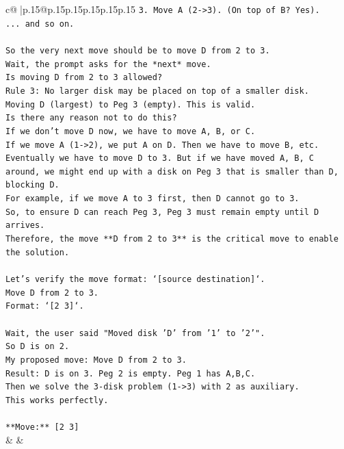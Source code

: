 \documentclass{article}
\begin{document}
{\begin{supertabular}{c@{$\;$}|p{.15\linewidth}@{}p{.15\linewidth}p{.15\linewidth}p{.15\linewidth}p{.15\linewidth}p{.15\linewidth}}
{{{\texttt{3. Move A (2{-}>3). (On top of B? Yes).} \\
\texttt{... and so on.} \\
\\ 
\texttt{So the very next move should be to move D from 2 to 3.} \\
\texttt{Wait, the prompt asks for the *next* move.} \\
\texttt{Is moving D from 2 to 3 allowed?} \\
\texttt{Rule 3: No larger disk may be placed on top of a smaller disk.} \\
\texttt{Moving D (largest) to Peg 3 (empty). This is valid.} \\
\texttt{Is there any reason not to do this?} \\
\texttt{If we don't move D now, we have to move A, B, or C.} \\
\texttt{If we move A (1{-}>2), we put A on D. Then we have to move B, etc. Eventually we have to move D to 3. But if we have moved A, B, C around, we might end up with a disk on Peg 3 that is smaller than D, blocking D.} \\
\texttt{For example, if we move A to 3 first, then D cannot go to 3.} \\
\texttt{So, to ensure D can reach Peg 3, Peg 3 must remain empty until D arrives.} \\
\texttt{Therefore, the move **D from 2 to 3** is the critical move to enable the solution.} \\
\\ 
\texttt{Let's verify the move format: `{[}source destination{]}`.} \\
\texttt{Move D from 2 to 3.} \\
\texttt{Format: `{[}2 3{]}`.} \\
\\ 
\texttt{Wait, the user said "Moved disk 'D' from '1' to '2'".} \\
\texttt{So D is on 2.} \\
\texttt{My proposed move: Move D from 2 to 3.} \\
\texttt{Result: D is on 3. Peg 2 is empty. Peg 1 has A,B,C.} \\
\texttt{Then we solve the 3{-}disk problem (1{-}>3) with 2 as auxiliary.} \\
\texttt{This works perfectly.} \\
\\ 
\texttt{**Move:** {[}2 3{]}} \\
            }
        }
    }
    & & \\ \\


\end{supertabular}}
\end{document}

